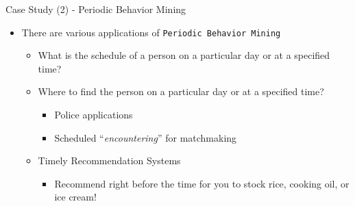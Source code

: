 \documentclass[
 size=14pt,
 paper=smartboard,  %
 mode=present, 		%
 display=slides, 	%
 style=tuliplab,  	%
 pauseslide,
 fleqn,leqno]{powerdot}{}
\begin{document}
\begin{slide}[toc=,bm=]{Case Study (2) - Periodic Behavior Mining}

\begin{itemize}
\item
There are various applications of \texttt{Periodic Behavior Mining}

    \begin{itemize}
    \item
    What is the schedule of a person on a particular day or at a specified time?

    \item
    Where to find the person on a particular day or at a specified time?
        \begin{itemize}
        \item
        Police applications

        \item
        Scheduled ``\textit{encountering}'' for matchmaking
        \end{itemize}
    \item
    Timely Recommendation Systems
        \begin{itemize}
        \item
        Recommend right before the time for you to stock rice, cooking oil, or ice cream!
        \end{itemize}

\end{itemize}
\end{itemize}

\end{slide}


%
%
%
%
\end{document}
